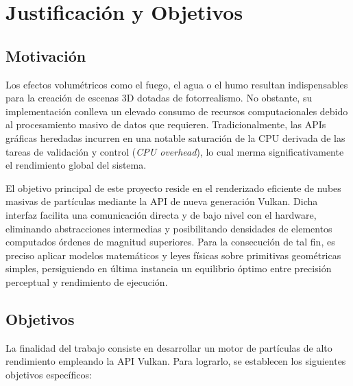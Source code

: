 \chapter{Justificación y Objetivos}
\label{sec:justificacion_y_objetivos}

\section{Motivación}
Los efectos volumétricos como el fuego, el agua o el humo resultan indispensables para la creación de escenas 3D dotadas de fotorrealismo. No obstante, su implementación conlleva un elevado consumo de recursos computacionales debido al procesamiento masivo de datos que requieren.
Tradicionalmente, las APIs gráficas heredadas incurren en una notable saturación de la CPU derivada de las tareas de validación y control (\textit{CPU overhead}), lo cual merma significativamente el rendimiento global del sistema.

El objetivo principal de este proyecto reside en el renderizado eficiente de nubes masivas de partículas mediante la API de nueva generación Vulkan. 
Dicha interfaz facilita una comunicación directa y de bajo nivel con el hardware, eliminando abstracciones intermedias y posibilitando densidades de elementos computados órdenes de magnitud superiores. 
Para la consecución de tal fin, es preciso aplicar modelos matemáticos y leyes físicas sobre primitivas geométricas simples, persiguiendo en última instancia un equilibrio óptimo entre precisión perceptual y rendimiento de ejecución.

 
\section{Objetivos}
La finalidad del trabajo consiste en desarrollar un motor de partículas de alto rendimiento empleando la API Vulkan. Para lograrlo, se establecen los siguientes objetivos específicos:                                     


